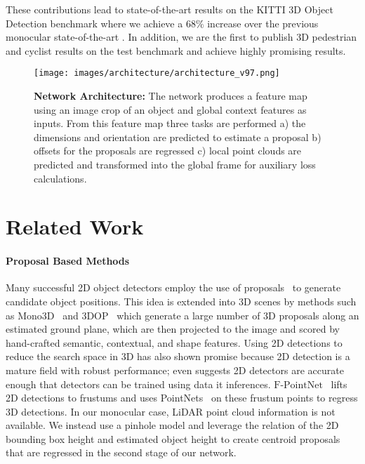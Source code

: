\documentclass[10pt,twocolumn,letterpaper]{article}
\begin{document}
	These contributions lead to state-of-the-art results on the KITTI 3D Object Detection benchmark where we achieve a $68\%$ increase over the previous monocular state-of-the-art \cite{lindernoren}. In addition, we are the first to publish 3D pedestrian and cyclist results on the test benchmark and achieve highly promising results.
	
	\begin{figure*}[t]
		\begin{center}
			\texttt{[image: images/architecture/architecture\_v97.png]}
		\end{center}
		\caption{\textbf{Network Architecture:} The network produces a feature map using an image crop of an object and global context features as inputs. From this feature map three tasks are performed a) the dimensions and orientation are predicted to estimate a proposal b) offsets for the proposals are regressed c) local point clouds are predicted and transformed into the global frame for auxiliary loss calculations.}
		\label{fig:architecture}
	\end{figure*}
	
	\section{Related Work}
	
	\paragraph{Proposal Based Methods}
	Many successful 2D object detectors employ the use of proposals~\cite{cheng2014bing, lee2015learning, ren_fasterrcnn, van2011segmentation, zitnick2014edge} to generate candidate object positions. This idea is extended into 3D scenes by methods such as Mono3D~\cite{chen_mono3d} and 3DOP~\cite{chen_3dop} which generate a large number of 3D proposals along an estimated ground plane, which are then projected to the image and scored by hand-crafted semantic, contextual, and shape features. Using 2D detections to reduce the search space in 3D has also shown promise because 2D detection is a mature field with robust performance; \cite{data_distillation_radosavovic} even suggests 2D detectors are accurate enough that detectors can be trained using data it inferences. $\text{F-PointNet}$~\cite{qi_fpointnet} lifts 2D detections to frustums and uses PointNets~\cite{qi2017pointnet, qi2017pointnet++} on these frustum points to regress 3D detections. In our monocular case, LiDAR point cloud information is not available. We instead use a pinhole model and leverage the relation of the 2D bounding box height and estimated object height to create centroid proposals that are regressed in the second stage of our network. 
	
\end{document}
